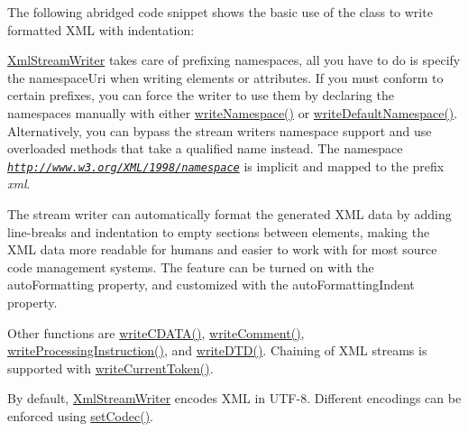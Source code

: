 The following abridged code snippet shows the basic use of the class to write formatted X\+ML with indentation\+:


\begin{DoxyCodeInclude}
\end{DoxyCodeInclude}
 
\begin{DoxyCodeInclude}
\end{DoxyCodeInclude}
 
\begin{DoxyCodeInclude}
\end{DoxyCodeInclude}
 \hyperlink{class_xml_stream_writer}{Xml\+Stream\+Writer} takes care of prefixing namespaces, all you have to do is specify the {\ttfamily namespace\+Uri} when writing elements or attributes. If you must conform to certain prefixes, you can force the writer to use them by declaring the namespaces manually with either \hyperlink{class_xml_stream_writer_ae04b7c7035435fd98cc625257776e732}{write\+Namespace()} or \hyperlink{class_xml_stream_writer_ad545600b4e2c9d73ad9e216a20ff081e}{write\+Default\+Namespace()}. Alternatively, you can bypass the stream writer\textquotesingle{}s namespace support and use overloaded methods that take a qualified name instead. The namespace {\itshape \href{http://www.w3.org/XML/1998/namespace}{\tt http\+://www.\+w3.\+org/\+X\+M\+L/1998/namespace}} is implicit and mapped to the prefix {\itshape xml}.

The stream writer can automatically format the generated X\+ML data by adding line-\/breaks and indentation to empty sections between elements, making the X\+ML data more readable for humans and easier to work with for most source code management systems. The feature can be turned on with the  auto\+Formatting property, and customized with the  auto\+Formatting\+Indent property.

Other functions are \hyperlink{class_xml_stream_writer_a812b894549f810c701ca3826acd9cc65}{write\+C\+D\+A\+T\+A()}, \hyperlink{class_xml_stream_writer_aa250fc649bdef6373d1f25d4bc7db431}{write\+Comment()}, \hyperlink{class_xml_stream_writer_a5b31ab7e5667538264c8d8fa8de79eda}{write\+Processing\+Instruction()}, and \hyperlink{class_xml_stream_writer_a6e2b9fe72e7a85b044690cf41aee18fe}{write\+D\+T\+D()}. Chaining of X\+ML streams is supported with \hyperlink{class_xml_stream_writer_ad3fc36a8359435e85bb0fa85dc785d70}{write\+Current\+Token()}.

By default, \hyperlink{class_xml_stream_writer}{Xml\+Stream\+Writer} encodes X\+ML in U\+T\+F-\/8. Different encodings can be enforced using \hyperlink{class_xml_stream_writer_ab73a5ee5db6824afd4a2bc66e8f12e78}{set\+Codec()}.

